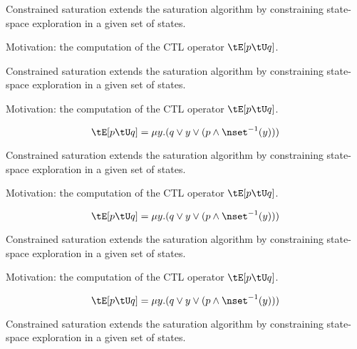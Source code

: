 
\vfill

Constrained saturation extends the saturation algorithm by constraining state-space exploration in a given set of states.

Motivation: the computation of the CTL operator $\tE [p \tU q]$.


%

\vfill


\vfill
Constrained saturation extends the saturation algorithm by constraining state-space exploration in a given set of states.

Motivation: the computation of the CTL operator $\tE [p \tU q]$.


$$\tE[p \tU q] = \mu y.(q \lor y \lor (p \land \nset^{-1}(y)))$$

\vfill


\vfill
Constrained saturation extends the saturation algorithm by constraining state-space exploration in a given set of states.

Motivation: the computation of the CTL operator $\tE [p \tU q]$.


$$\tE[p \tU q] = \mu y.(q \lor y \lor (p \land \nset^{-1}(y)))$$

\vfill


\vfill
Constrained saturation extends the saturation algorithm by constraining state-space exploration in a given set of states.

Motivation: the computation of the CTL operator $\tE [p \tU q]$.


$$\tE[p \tU q] = \mu y.(q \lor y \lor (p \land \nset^{-1}(y)))$$

\vfill


\vfill
Constrained saturation extends the saturation algorithm by constraining state-space exploration in a given set of states.

